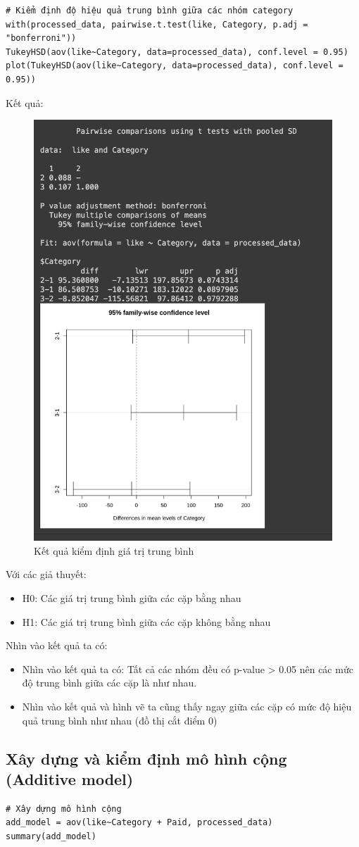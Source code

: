 \begin{itemize}
\begin{itemize}
\begin{lstlisting}
# Kiểm định độ hiệu quả trung bình giữa các nhóm category
with(processed_data, pairwise.t.test(like, Category, p.adj = "bonferroni"))
TukeyHSD(aov(like~Category, data=processed_data), conf.level = 0.95)
plot(TukeyHSD(aov(like~Category, data=processed_data), conf.level = 0.95))
\end{lstlisting}
Kết quả:
\begin{figure}[H]
    \centering
    \includegraphics[width=0.5\linewidth]{part23_figures/20.png}
    \caption{Kết quả kiểm định giá trị trung bình}
    \label{fig:Kết quả kiểm định giá trị trung bình}
\end{figure}

Với các giả thuyết:
    \begin{itemize}
        \item H0: Các giá trị trung bình giữa các cặp bằng nhau
        \item H1: Các giá trị trung bình giữa các cặp không bằng nhau
    \end{itemize}
    Nhìn vào kết quả ta có:
    \begin{itemize}
        \item Nhìn vào kết quả ta có: Tất cả các nhóm đều có p-value > 0.05 nên các mức độ trung bình giữa các cặp là như nhau.
        \item Nhìn vào kết quả và hình vẽ ta cũng thấy ngay giữa các cặp có mức độ hiệu quả trung bình như nhau (đồ thị cắt điểm 0)
    \end{itemize}
\end{itemize}
\subsection{Xây dựng và kiểm định mô hình cộng (Additive model)}
\begin{lstlisting}
# Xây dựng mô hình cộng
add_model = aov(like~Category + Paid, processed_data)
summary(add_model)
\end{lstlisting}


\end{itemize}
